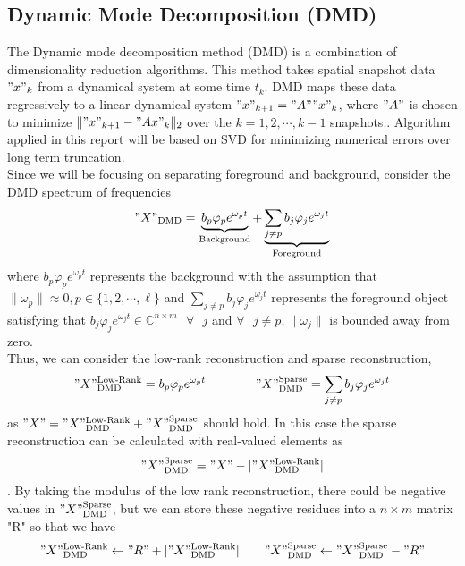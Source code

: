 \documentclass[11pt,a4paper]{article}
\numberwithin{equation}{subsection}
\begin{document}
\subsection{Dynamic Mode Decomposition (DMD)}
The Dynamic mode decomposition method (DMD) is a combination of dimensionality reduction algorithms.\cite{dmd1} This method takes spatial snapshot data $"x"_k$ from a dynamical system at some time $t_k$. DMD maps 
these data regressively to a linear dynamical system $"x"_{k+1}="A""x"_k$, where $"A"$ is chosen to minimize $\|"x"_{k+1}-"Ax"_k\|_2$ over the $k=1, 2, \cdots, k-1$ snapshots.\cite{dmd1}\cite{dmd2}. Algorithm applied in this report will be based on SVD for minimizing numerical errors over long term truncation.\\
Since we will be focusing on separating foreground and background, consider the DMD spectrum of frequencies
\begin{equation}
"X"_{\text{DMD}}=\underbrace{b_p\varphi_pe^{\omega_pt}}_\text{Background}+\underbrace{\sum_{j\neq p}b_j\varphi_je^{\omega_jt}}_\text{Foreground}
\end{equation}
where $b_p\varphi_pe^{\omega_pt}$ represents the background with the assumption that $\|\omega_p\|\approx0, p\in\{1, 2, \cdots, \ell\}$ and $\sum_{j\neq p}b_j\varphi_je^{\omega_jt}$ represents the foreground object satisfying that $b_j\varphi_je^{\omega_jt}\in\mathbb{C}^{n\times m}\text{ }\forall\text{ } j$ and $\forall\text{ } j\neq p, \|\omega_j\|$ is bounded away from zero.\\
Thus, we can consider the low-rank reconstruction and sparse reconstruction,
\begin{equation}
"X"_{\text{DMD}}^{\text{Low-Rank}}=b_p\varphi_pe^{\omega_pt}\qquad\qquad "X"_{\text{DMD}}^{\text{Sparse}}=\sum_{j\neq p}b_j\varphi_je^{\omega_jt}
\end{equation}
as $"X"="X"_{\text{DMD}}^{\text{Low-Rank}}+"X"_{\text{DMD}}^{\text{Sparse}}$ should hold. In this case the sparse reconstruction can be calculated with real-valued elements as
\begin{equation}
"X"_{\text{DMD}}^{\text{Sparse}}="X"-|"X"_{\text{DMD}}^{\text{Low-Rank}}|
\end{equation}.
By taking the modulus of the low rank reconstruction, there could be negative values in $"X"_{\text{DMD}}^{\text{Sparse}}$, but we can store these negative residues into a $n\times m$ matrix "R" so that we have
\begin{equation}
"X"_{\text{DMD}}^{\text{Low-Rank}}\leftarrow"R"+|"X"_{\text{DMD}}^{\text{Low-Rank}}|\qquad "X"_{\text{DMD}}^{\text{Sparse}}\leftarrow "X"_{\text{DMD}}^{\text{Sparse}}-"R"
\end{equation}
\end{document}
